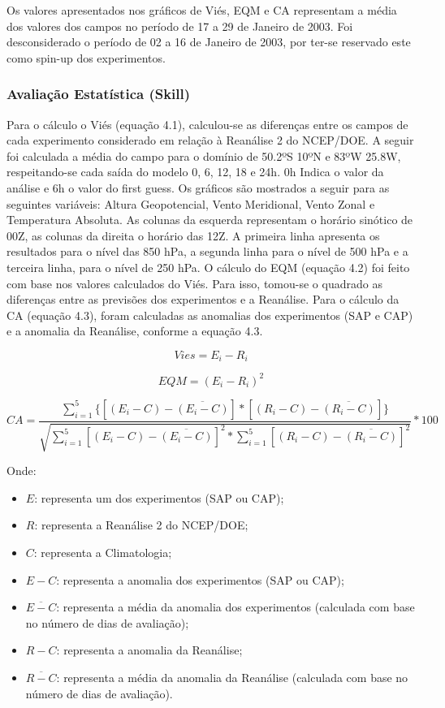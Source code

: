 Os valores apresentados nos gráficos de Viés, EQM e CA representam a média dos valores dos campos no período de 17 a 29 de Janeiro de 2003. Foi desconsiderado o período de 02 a 16 de Janeiro de 2003, por ter-se reservado este como spin-up dos experimentos.

\subsubsection{Avaliação Estatística (Skill)}

Para o cálculo o Viés (equação 4.1), calculou-se as diferenças entre os campos de cada experimento considerado em relação à Reanálise 2 do NCEP/DOE. A seguir foi calculada a média do campo para o domínio de 50.2ºS 10ºN e 83ºW 25.8W, respeitando-se cada saída do modelo 0, 6, 12, 18 e 24h. 0h Indica o valor da análise e 6h o valor do first guess. Os gráficos são mostrados a seguir para as seguintes variáveis: Altura Geopotencial, Vento Meridional, Vento Zonal e Temperatura Absoluta. As colunas da esquerda representam o horário sinótico de 00Z, as colunas da direita o horário das 12Z. A primeira linha apresenta os resultados para o nível das 850 hPa, a segunda linha para o nível de 500 hPa e a terceira linha, para o nível de 250 hPa. O cálculo do EQM (equação 4.2) foi feito com base nos valores calculados do Viés. Para isso, tomou-se o quadrado as diferenças entre as previsões dos experimentos e a Reanálise. Para o cálculo da CA (equação 4.3), foram calculadas as anomalias dos experimentos (SAP e CAP) e a anomalia da Reanálise, conforme a equação 4.3.

\begin{equation}
Vies=E_{i}-R_{i}
\label{form10}
\end{equation}

\begin{equation}
EQM=(E_{i}-R_{i})^{2}
\label{form11}
\end{equation}

\begin{equation}
CA=\frac{\sum_{i=1}^{5}\{[(E_{i}-C)-\overline{(E_{i}-C)}]*[(R_{i}-C)-\overline{(R_{i}-C)}]\}}{\sqrt{\sum_{i=1}^{5}[(E_{i}-C)-\overline{(E_{i}-C)}]^{2}*\sum_{i=1}^{5}[(R_{i}-C)-\overline{(R_{i}-C)}]^{2}}}*100
\label{form12}
\end{equation}

Onde:

\begin{itemize}
\item $E$: representa um dos experimentos (SAP ou CAP);
\item $R$: representa a Reanálise 2 do NCEP/DOE;
\item $C$: representa a Climatologia;
\item $E-C$: representa a anomalia dos experimentos (SAP ou CAP);
\item $\overline{E-C}$: representa a média da anomalia dos experimentos (calculada com base no número de dias de avaliação);
\item $R-C$: representa a anomalia da Reanálise;
\item $\overline{R-C}$: representa a média da anomalia da Reanálise (calculada com base no número de dias de avaliação).
\end{itemize}

